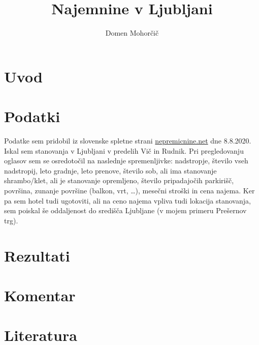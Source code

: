\documentclass[a4paper, 11pt]{article}
\begin{document}
\title{Najemnine v Ljubljani}
\author{Domen Mohorčič}
\maketitle

\section{Uvod}

\section{Podatki}

Podatke sem pridobil iz slovenske spletne strani
\href{https://www.nepremicnine.net}{nepremicnine.net} dne 8.8.2020.
Iskal sem stanovanja v Ljubljani v predelih Vič in Rudnik.
Pri pregledovanju oglasov sem se osredotočil na naslednje spremenljivke:
nadstropje, število vseh nadstropij, leto gradnje, leto prenove, število sob,
ali ima stanovanje shrambo/klet, ali je stanovanje opremljeno, število
pripadajočih parkirišč, površina, zunanje površine (balkon, vrt, \dots),
mesečni stroški in cena najema. Ker pa sem hotel tudi ugotoviti, ali
na ceno najema vpliva tudi lokacija stanovanja, sem poiskal še oddaljenost
do središča Ljubljane (v mojem primeru Prešernov trg).

\section{Rezultati}

\section{Komentar}

\section{Literatura}
\end{document}
